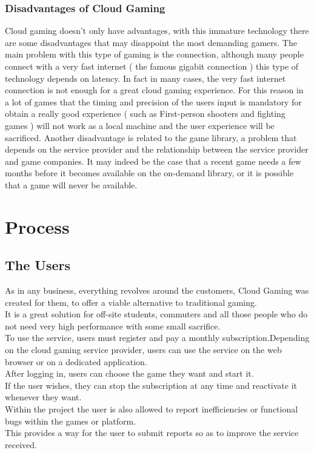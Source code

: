 \documentclass[a4paper,12pt]{report}
\begin{document}
\subsection{Disadvantages of Cloud Gaming}
Cloud gaming doesn't only have advantages, with this immature technology there are some disadvantages that may disappoint the most demanding gamers. The main problem with this type of gaming is the connection, although many people connect with a very fast internet ( the famous gigabit connection ) this type of technology depends on latency. In fact in many cases, the very fast internet connection is not enough for a great cloud gaming experience. For this reason in a lot of games that the timing and precision of the users input is mandatory for obtain a really good experience ( such as First-person shooters and fighting games ) will not work as a local machine and the user experience will be sacrificed. Another disadvantage is related to the game library, a problem that depends on the service provider and the relationship between the service provider and game companies. It may indeed be the case that a recent game needs a few months before it becomes available on the on-demand library, or it is possible that a game will never be available. 
\chapter{Process}
\label{cap2}
\section{The Users}
As in any business, everything revolves around the customers, Cloud Gaming was created for them, to offer a viable alternative to traditional gaming.\\
It is a great solution for off-site students, commuters and all those people who do not need very high performance with some small sacrifice. \\
To use the service, users must register and pay a monthly subscription.Depending on the cloud gaming service provider, users can use the service on the web browser or on a dedicated application.\\
After logging in, users can choose the game they want and start it.\\
If the user wishes, they can stop the subscription at any time and reactivate it whenever they want. \\
Within the project the user is also allowed to report inefficiencies or functional bugs within the games or platform.\\
This provides a way for the user to submit reports so as to improve the service received. 
\end{document}
